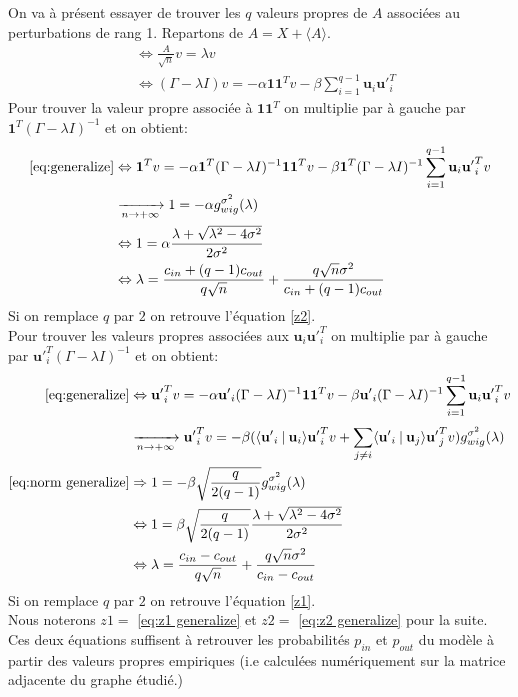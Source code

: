 On va à présent essayer de trouver les $q$ valeurs propres de $A$ associées au perturbations de rang 1. 
Repartons de $A = X + \langle A \rangle$.
\begin{align}
&\Leftrightarrow \frac{A}{\sqrt{n}}v =\lambda v \nonumber \\
&\Leftrightarrow (\Gamma - \lambda I)v =-\alpha \mathbf{11}^Tv - \beta \sum_{i=1}^{q-1}\mathbf{u}_i\mathbf{u'}_i^T \label{eq:generalize}
\end{align}
Pour trouver la valeur propre associée à $\mathbf{11}^T$ on multiplie par à gauche par $\mathbf{1}^T(\Gamma -\lambda I)^{-1}$ et on obtient:
\begin{align}
\eqref{eq:generalize} &\Leftrightarrow \mathbf{1}^Tv =-\alpha \mathbf{1}^T(\Gamma -\lambda I)^{-1}\mathbf{11}^Tv - \beta \mathbf{1}^T(\Gamma -\lambda I)^{-1}\sum_{i=1}^{q-1}\mathbf{u}_i\mathbf{u'}_i^Tv \nonumber\\
&\xrightarrow[n \to +\infty]{} 1 = -\alpha g_{wig}^{\sigma^2}(\lambda) \nonumber\\
&\Leftrightarrow 1 = \alpha \frac{\lambda + \sqrt{\lambda^2 - 4\sigma^2}}{2\sigma^2} \nonumber\\
&\Leftrightarrow \lambda = \frac{c_{in} + (q-1)c_{out}}{q\sqrt{n}} + \frac{q\sqrt{n}\sigma^2}{c_{in} + (q-1)c_{out}} \label{eq:z2 generalize}
\end{align}
Si on remplace $q$ par $2$ on retrouve l'équation \eqref{z2}.\\
Pour trouver les valeurs propres associées aux $\mathbf{u}_i\mathbf{u'}_i^T$ on multiplie par à gauche par $\mathbf{u'}_i^T(\Gamma -\lambda I)^{-1}$ et on obtient:
\begin{align}
\eqref{eq:generalize} &\Leftrightarrow \mathbf{u'}_i^Tv =-\alpha \mathbf{u'}_i(\Gamma -\lambda I)^{-1}\mathbf{11}^Tv - \beta \mathbf{u'}_i(\Gamma -\lambda I)^{-1}\sum_{i=1}^{q-1}\mathbf{u}_i\mathbf{u'}_i^Tv \nonumber\\
&\xrightarrow[n \to +\infty]{} \mathbf{u'}_i^Tv = -\beta(\langle \mathbf{u'}_i\:|\: \mathbf{u}_i \rangle\mathbf{u'}_i^Tv + \sum_{j \neq i}^{} \langle \mathbf{u'}_i\:|\: \mathbf{u}_j \rangle\mathbf{u'}_j^Tv)g_{wig}^{\sigma^2}(\lambda) \nonumber\\
\eqref{eq:norm generalize} &\Rightarrow 1 = -\beta  \sqrt{\frac{q}{2(q-1)}} g_{wig}^{\sigma^2}(\lambda) \nonumber\\
&\Leftrightarrow 1 = \beta \sqrt{\frac{q}{2(q-1)}} \frac{\lambda + \sqrt{\lambda^2 - 4\sigma^2}}{2\sigma^2} \nonumber\\
&\Leftrightarrow \lambda = \frac{c_{in} - c_{out}}{q\sqrt{n}} + \frac{q\sqrt{n}\sigma^2}{c_{in} - c_{out}}\label{eq:z1 generalize}
\end{align}
Si on remplace $q$ par $2$ on retrouve l'équation \eqref{z1}.\\
Nous noterons $z1 =$ \eqref{eq:z1 generalize}  et $z2 =$ \eqref{eq:z2 generalize} pour la suite.
Ces deux équations suffisent à retrouver les probabilités $p_{in}$ et $p_{out}$ du modèle à partir des valeurs propres empiriques (i.e calculées numériquement sur la matrice adjacente du graphe étudié.)\\

